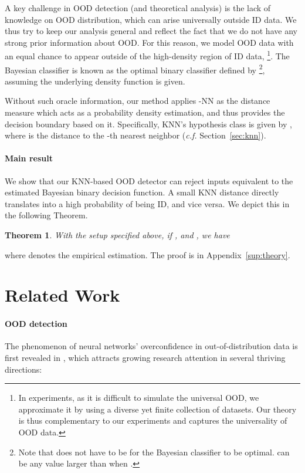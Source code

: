 \documentclass[nohyperref]{article}
\newcommand{\method}{{KNN}}
\theoremstyle{plain}
\newtheorem{theorem}{Theorem}[section]
\theoremstyle{definition}
\theoremstyle{remark}
\begin{document}
A key challenge in OOD detection (and theoretical analysis) is the lack of knowledge on OOD distribution, which can arise universally outside ID data. We thus try to keep our analysis general and reflect the fact that we do not have any strong prior information about OOD. For this reason, we model OOD data with an equal chance to appear outside of the high-density region of ID data, \footnote{In experiments, as it is difficult to simulate the universal OOD, we approximate it by using a diverse yet finite collection of datasets. Our theory is thus complementary to our experiments and captures the universality of OOD data.}. The Bayesian classifier is known as the optimal binary classifier defined by \footnote{Note that  does not have to be  for the Bayesian classifier to be optimal.  can be any value 
larger than  when .}, assuming the underlying density function is given. 

Without such oracle information, our method applies -NN as the distance measure which acts as a probability density estimation, and thus provides the decision boundary based on it. Specifically, \method's hypothesis class  is given by , where  is the distance to the -th nearest neighbor (\emph{c.f.} Section~\ref{sec:knn}). 


\paragraph{Main result} We show that our KNN-based OOD detector can reject inputs equivalent to the estimated Bayesian binary decision function. A small KNN distance  directly translates into a high probability of being ID, and vice versa. We depict this in the following Theorem.

\begin{theorem} 
\label{th:knn2bayes}
With the setup specified above, if , and , we have

\end{theorem}
where  denotes the empirical estimation. The proof is in Appendix~\ref{sup:theory}. 




\section{Related Work}
\label{sec:related}

\paragraph{OOD detection}
The phenomenon of neural networks' overconfidence in out-of-distribution data is first revealed in \cite{nguyen2015deep}, which attracts growing research attention in several thriving directions:
\end{document}
